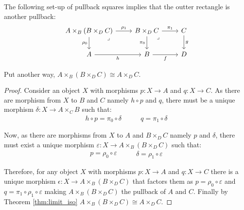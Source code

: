 \begin{theorem}
  The following set-up of pullback squares implies that the outter rectangle
  is another pullback:
  \[\begin{tikzcd}[ampersand replacement=\&]
    {A\times_B(B\times_D C)} \& {B\times_D C} \& C \\
    A \& B \& D
    \arrow["{\pi_0}"', from=1-2, to=2-2]
    \arrow["{\pi_1}", from=1-2, to=1-3]
    \arrow["f"', from=2-2, to=2-3]
    \arrow["g", from=1-3, to=2-3]
    \arrow["h"', from=2-1, to=2-2]
    \arrow["{\rho_0}"', from=1-1, to=2-1]
    \arrow["{\rho_1}", from=1-1, to=1-2]
    \arrow["\lrcorner"{anchor=center, pos=0.125}, draw=none, from=1-2, to=2-3]
    \arrow["\lrcorner"{anchor=center, pos=0.125}, draw=none, from=1-1, to=2-2]
  \end{tikzcd}\]

  Put another way, $A\times_B (B\times_D C) \cong A\times_D C$.
  \begin{proof}
    Consider an object $X$ with morphisms $p: X\to A$ and $q:X\to C$. As there
    are morphism from $X$ to $B$ and $C$ namely $h\circ p$ and $q$, there must
    be a unique morphism $\delta: X\to A\times_C B$ such that:
    \[
      \begin{gathered}
        h\circ p = \pi_0 \circ \delta
      \end{gathered}
      \qquad
      \begin{gathered}
        q = \pi_1 \circ \delta
      \end{gathered}
    \]

    Now, as there are morphisms from $X$ to $A$ and $B\times_D C$ namely $p$ and
    $\delta$, there must exist a unique morphism $\varepsilon: X\to
    A\times_B(B\times_D C)$ such that:
    \[
      \begin{gathered}
        p = \rho_0 \circ \varepsilon
      \end{gathered}
      \qquad
      \begin{gathered}
        \delta = \rho_1 \circ \varepsilon
      \end{gathered}
    \]

    Therefore, for any object $X$ with morphisms $p:X\to A$ and $q:X\to C$ there
    is a unique morphism $\epsilon: X\to A\times_B(B\times_D C)$ that factors
    them as $p=\rho_0 \circ \varepsilon$ and $q=\pi_1\circ \rho_1\circ
    \varepsilon$ making $A\times_B(B\times_D C)$ the pullback of $A$ and $C$.
    Finally by Theorem \ref{thm:limit_iso} $A\times_B(B\times_D C) \cong
    A\times_D C$.
  \end{proof}
\end{theorem}